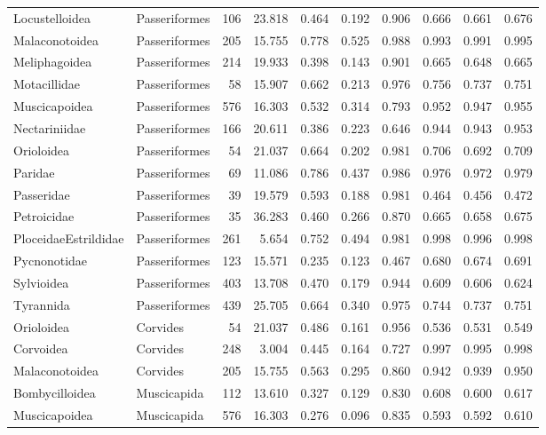\begin{table}[ht]
\begin{tabular}{llrrrrrrrr}
  Locustelloidea & Passeriformes &  106 & 23.818 & 0.464 & 0.192 & 0.906 & 0.666 & 0.661 & 0.676 \\ 
  Malaconotoidea & Passeriformes &  205 & 15.755 & 0.778 & 0.525 & 0.988 & 0.993 & 0.991 & 0.995 \\ 
  Meliphagoidea & Passeriformes &  214 & 19.933 & 0.398 & 0.143 & 0.901 & 0.665 & 0.648 & 0.665 \\ 
  Motacillidae & Passeriformes &   58 & 15.907 & 0.662 & 0.213 & 0.976 & 0.756 & 0.737 & 0.751 \\ 
  Muscicapoidea & Passeriformes &  576 & 16.303 & 0.532 & 0.314 & 0.793 & 0.952 & 0.947 & 0.955 \\ 
  Nectariniidae & Passeriformes &  166 & 20.611 & 0.386 & 0.223 & 0.646 & 0.944 & 0.943 & 0.953 \\ 
  Orioloidea & Passeriformes &   54 & 21.037 & 0.664 & 0.202 & 0.981 & 0.706 & 0.692 & 0.709 \\ 
  Paridae & Passeriformes &   69 & 11.086 & 0.786 & 0.437 & 0.986 & 0.976 & 0.972 & 0.979 \\ 
  Passeridae & Passeriformes &   39 & 19.579 & 0.593 & 0.188 & 0.981 & 0.464 & 0.456 & 0.472 \\ 
  Petroicidae & Passeriformes &   35 & 36.283 & 0.460 & 0.266 & 0.870 & 0.665 & 0.658 & 0.675 \\ 
  PloceidaeEstrildidae & Passeriformes &  261 & 5.654 & 0.752 & 0.494 & 0.981 & 0.998 & 0.996 & 0.998 \\ 
  Pycnonotidae & Passeriformes &  123 & 15.571 & 0.235 & 0.123 & 0.467 & 0.680 & 0.674 & 0.691 \\ 
  Sylvioidea & Passeriformes &  403 & 13.708 & 0.470 & 0.179 & 0.944 & 0.609 & 0.606 & 0.624 \\ 
  Tyrannida & Passeriformes &  439 & 25.705 & 0.664 & 0.340 & 0.975 & 0.744 & 0.737 & 0.751 \\ 
  Orioloidea & Corvides &   54 & 21.037 & 0.486 & 0.161 & 0.956 & 0.536 & 0.531 & 0.549 \\ 
  Corvoidea & Corvides &  248 & 3.004 & 0.445 & 0.164 & 0.727 & 0.997 & 0.995 & 0.998 \\ 
  Malaconotoidea & Corvides &  205 & 15.755 & 0.563 & 0.295 & 0.860 & 0.942 & 0.939 & 0.950 \\ 
  Bombycilloidea & Muscicapida &  112 & 13.610 & 0.327 & 0.129 & 0.830 & 0.608 & 0.600 & 0.617 \\ 
  Muscicapoidea & Muscicapida &  576 & 16.303 & 0.276 & 0.096 & 0.835 & 0.593 & 0.592 & 0.610 \\ 

\end{tabular}
\end{table}
